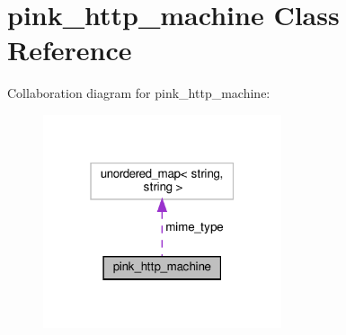 \hypertarget{classpink__http__machine}{}\section{pink\+\_\+http\+\_\+machine Class Reference}
\label{classpink__http__machine}


Collaboration diagram for pink\+\_\+http\+\_\+machine\+:
\nopagebreak
\begin{figure}[H]
\begin{center}
\leavevmode
\includegraphics[width=199pt]{classpink__http__machine__coll__graph}
\end{center}
\end{figure}
